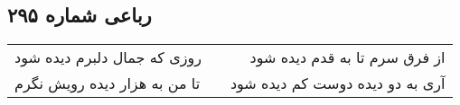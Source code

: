 \begin{center}
\section*{رباعی شماره ۲۹۵}
\label{sec:sh295}
\begin{longtable}{l p{0.5cm} r}
روزی که جمال دلبرم دیده شود
&&
از فرق سرم تا به قدم دیده شود
\\
تا من به هزار دیده رویش نگرم
&&
آری به دو دیده دوست کم دیده شود
\\
\end{longtable}
\end{center}
